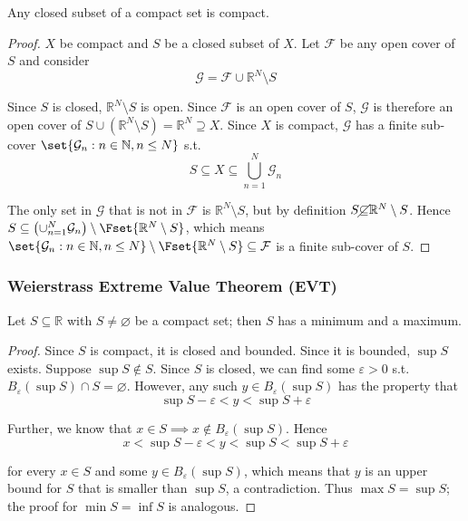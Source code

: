 \documentclass{article}
\begin{document}
\begin{theorem}\label{thm:lecture3_compactness_closed_compact}
  Any closed subset of a compact set is compact.
\end{theorem}

\begin{proof}
  $X$ be compact and $S$ be a closed subset of $X$. Let $\mathcal{F}$ be any open cover of $S$ and consider
  \[
    \mathcal{G} = \mathcal{F} \cup \mathbb{R}^N \setminus S
  \]

  Since $S$ is closed, $\mathbb{R}^N \setminus S$ is open. Since $\mathcal{F}$ is an open cover of $S$, $\mathcal{G}$ is therefore an open cover of $S \cup (\mathbb{R}^N \setminus S) = \mathbb{R}^N \supseteq X$. Since $X$ is compact, $\mathcal{G}$ has a finite sub-cover $\set{\mathcal{G}_n: n \in \mathbb{N}, n \le N}$ s.t.
  \[
    S \subseteq X \subseteq \bigcup_{n = 1}^N \mathcal{G}_n
  \]

  The only set in $\mathcal{G}$ that is not in $\mathcal{F}$ is $\mathbb{R}^N \setminus S$, but by definition $S \cancel\subseteq \mathbb{R}^N \setminus S$. Hence $S \subseteq \left(\cup_{n = 1}^N \mathcal{G}_n\right) \setminus \Fset{\mathbb{R}^N \setminus S}$, which means $\set{\mathcal{G}_n: n \in \mathbb{N}, n \le N} \setminus \Fset{\mathbb{R}^N \setminus S} \subseteq \mathcal{F}$ is a finite sub-cover of $S$.
\end{proof}

\subsubsection{Weierstrass Extreme Value Theorem (EVT)}
\label{ssub:weierstrass_extreme_value_theorem_evt_}

\begin{theorem}
  Let $S \subseteq \mathbb{R}$ with $S \ne \varnothing$ be a compact set; then $S$ has a minimum and a maximum.
\end{theorem}

\begin{proof}
  Since $S$ is compact, it is closed and bounded. Since it is bounded, $\sup S$ exists. Suppose $\sup S \notin S$.  Since $S$ is closed, we can find some $\varepsilon > 0$ s.t. $B_\varepsilon(\sup S) \cap S = \varnothing$. However, any such $y \in B_\varepsilon(\sup S)$ has the property that
  \[
    \sup S - \varepsilon < y < \sup S + \varepsilon
  \]

  Further, we know that $x \in S \implies x \notin B_{\varepsilon}(\sup S)$. Hence
  \[
    x < \sup S - \varepsilon < y < \sup S < \sup S + \varepsilon
  \]

  for every $x \in S$ and some $y \in B_{\varepsilon}(\sup S)$, which means that $y$ is an upper bound for $S$ that is smaller than $\sup S$, a contradiction. Thus $\max S = \sup S$; the proof for $\min S = \inf S$ is analogous.
\end{proof}
\end{document}
